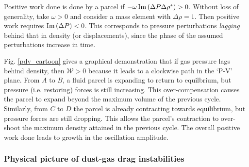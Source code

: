 Positive work done is done by a parcel if $-\omega \operatorname{Im}\left(\Delta  
P\Delta\rho^*\right)>0$. Without loss of generality, take $\omega>0$
and consider a mass element with $\Delta\rho = 1$. Then positive work 
requires $\operatorname{Im}\left(\Delta
P\right)<0$.  This corresponds to pressure perturbations \emph{lagging}
behind that in density (or displacements), since the phase of
the assumed perturbations increase in time.  


Fig. \ref{pdv_cartoon} gives a graphical demonstration that 
if gas pressure lags behind density, then %
$\mathcal{W}>0$ because it leads to a clockwise path in the
`P-V' plane. From $A$ to $B$, a fluid parcel is expanding to return to 
equilbrium, but pressure (i.e. restoring) forces is still
increasing. This over-compensation causes the parcel to expand
beyond the maximum volume of the previous cycle. 
Similarly, from $C$ to $D$ the parcel is already contracting towards
equilibrium, but pressure
forces are still dropping. This allows the  
parcel's contraction to over-shoot the maximum density attained in the
previous cycle. 
The 
overall positive work done leads to growth in the oscillation amplitude. 





\subsubsection{Physical picture of dust-gas drag instabilities} 



